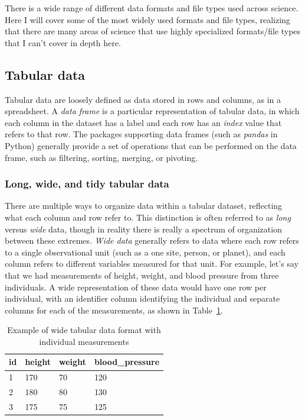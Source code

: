 There is a wide range of different data formats and file types used across science.  Here I will cover some of the most widely used formats and file types, realizing that there are many areas of science that use highly specialized formats/file types that I can't cover in depth here.

\subsection{Tabular data}

Tabular data are loosely defined as data stored in rows and columns, as in a spreadsheet.   A \textit{data frame} is a particular representation of tabular data, in which each column in the dataset has a label and each row has an \textit{index} value that refers to that row.  The packages supporting data frames (such as \textit{pandas} in Python) generally provide a set of operations that can be performed on the data frame, such as filtering, sorting, merging, or pivoting.

\subsubsection{Long, wide, and tidy tabular data}

There are multiple ways to organize data within a tabular dataset, reflecting what each column and row refer to.  This distinction is often referred to as \textit{long} versus \textit{wide} data, though in reality there is really a spectrum of organization between these extremes. \textit{Wide data} generally refers to data where each row refers to a single observational unit (such as a one site, person, or planet), and each column refers to different variables measured for that unit. For example, let's say that we had measurements of height, weight, and blood pressure from three individuals.  A wide representation of these data would have one row per individual, with an identifier column identifying the individual and separate columns for each of the measurements, as shown in Table~\ref{wide-data-table}.

\bigskip\noindent
\begin{table}[!htbp]
\centering
\begin{tabular}{p{}p{}p{}p{}}
\toprule
id & height & weight & blood\_pressure \\
\hline
1 & 170 & 70 & 120 \\
2 & 180 & 80 & 130 \\
3 & 175 & 75 & 125 \\
\bottomrule
\end{tabular}
\caption{Example of wide tabular data format with individual measurements}
\label{wide-data-table}
\end{table}

